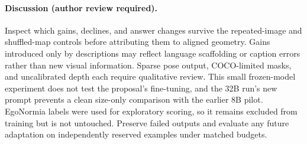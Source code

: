 \paragraph{Discussion (author review required).} Inspect which gains, declines, and answer changes survive the repeated-image and shuffled-map controls before attributing them to aligned geometry. Gains introduced only by descriptions may reflect language scaffolding or caption errors rather than new visual information. Sparse pose output, COCO-limited masks, and uncalibrated depth each require qualitative review. This small frozen-model experiment does not test the proposal's fine-tuning, and the 32B run's new prompt prevents a clean size-only comparison with the earlier 8B pilot. EgoNormia labels were used for exploratory scoring, so it remains excluded from training but is not untouched. Preserve failed outputs and evaluate any future adaptation on independently reserved examples under matched budgets.
